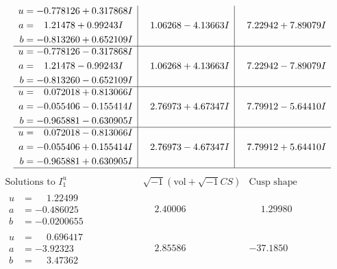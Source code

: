 \documentclass[1p]{elsarticle_modified}
\theoremstyle{definition}
\newcommand{\I}{\sqrt{-1}}
\begin{document}
$$\begin{array}{c|c|c}
\begin{aligned}
u &= -0.778126 + 0.317868 I \\
a &= \phantom{-}1.21478 + 0.99243 I \\
b &= -0.813260 + 0.652109 I\end{aligned}
 & \phantom{-}1.06268 - 4.13663 I & \phantom{-}7.22942 + 7.89079 I \\ \hline\begin{aligned}
u &= -0.778126 - 0.317868 I \\
a &= \phantom{-}1.21478 - 0.99243 I \\
b &= -0.813260 - 0.652109 I\end{aligned}
 & \phantom{-}1.06268 + 4.13663 I & \phantom{-}7.22942 - 7.89079 I \\ \hline\begin{aligned}
u &= \phantom{-}0.072018 + 0.813066 I \\
a &= -0.055406 - 0.155414 I \\
b &= -0.965881 - 0.630905 I\end{aligned}
 & \phantom{-}2.76973 + 4.67347 I & \phantom{-}7.79912 - 5.64410 I \\ \hline\begin{aligned}
u &= \phantom{-}0.072018 - 0.813066 I \\
a &= -0.055406 + 0.155414 I \\
b &= -0.965881 + 0.630905 I\end{aligned}
 & \phantom{-}2.76973 - 4.67347 I & \phantom{-}7.79912 + 5.64410 I\\
 \hline 
 \end{array}$$\newpage$$\begin{array}{c|c|c}  
\text{Solutions to }I^u_{1}& \I (\text{vol} + \sqrt{-1}CS) & \text{Cusp shape}\\
 \hline 
\begin{aligned}
u &= \phantom{-}1.22499\phantom{ +0.000000I} \\
a &= -0.486025\phantom{ +0.000000I} \\
b &= -0.0200655\phantom{ +0.000000I}\end{aligned}
 & \phantom{-}2.40006\phantom{ +0.000000I} & \phantom{-}1.29980\phantom{ +0.000000I} \\ \hline\begin{aligned}
u &= \phantom{-}0.696417\phantom{ +0.000000I} \\
a &= -3.92323\phantom{ +0.000000I} \\
b &= \phantom{-}3.47362\phantom{ +0.000000I}\end{aligned}
 & \phantom{-}2.85586\phantom{ +0.000000I} & -37.1850\phantom{ +0.000000I} \\ \hline\begin{aligned}

\end{aligned}
\end{array}$$
\end{document}
